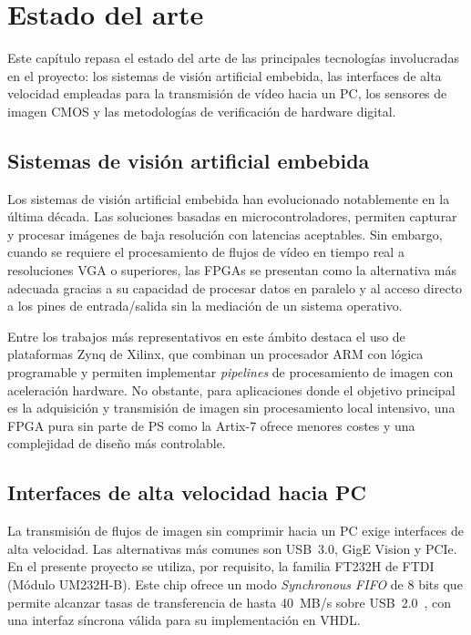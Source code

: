 \documentclass[../main.tex]{subfiles}
\begin{document}
\chapter{Estado del arte}
\label{chap:estado_del_arte}

Este capítulo repasa el estado del arte de las principales tecnologías involucradas en el proyecto: los sistemas de visión artificial embebida, las interfaces de alta velocidad empleadas para la transmisión de vídeo hacia un PC, los sensores de imagen CMOS y las metodologías de verificación de hardware digital.

\section{Sistemas de visión artificial embebida}

Los sistemas de visión artificial embebida han evolucionado notablemente en la última década. Las soluciones basadas en microcontroladores, permiten capturar y procesar imágenes de baja resolución con latencias aceptables. Sin embargo, cuando se requiere el procesamiento de flujos de vídeo en tiempo real a resoluciones \ac{VGA} o superiores, las \ac{FPGA}s se presentan como la alternativa más adecuada gracias a su capacidad de procesar datos en paralelo y al acceso directo a los pines de entrada/salida sin la mediación de un sistema operativo.

Entre los trabajos más representativos en este ámbito destaca el uso de plataformas Zynq de Xilinx, que combinan un procesador ARM con lógica programable y permiten implementar \textit{pipelines} de procesamiento de imagen con aceleración hardware. No obstante, para aplicaciones donde el objetivo principal es la adquisición y transmisión de imagen sin procesamiento local intensivo, una \ac{FPGA} pura sin parte de \ac{PS} como la Artix-7 ofrece menores costes y una complejidad de diseño más controlable.

\section{Interfaces de alta velocidad hacia PC}

La transmisión de flujos de imagen sin comprimir hacia un PC exige interfaces de alta velocidad. Las alternativas más comunes son USB~3.0, GigE Vision y PCIe. En el presente proyecto se utiliza, por requisito, la familia FT232H de FTDI (Módulo UM232H-B). Este chip ofrece un modo \textit{Synchronous FIFO} de 8 bits que permite alcanzar tasas de transferencia de hasta 40~MB/s sobre USB~2.0~\cite{ft232h_datasheet}, con una interfaz síncrona válida para su implementación en \ac{VHDL}.
\end{document}
